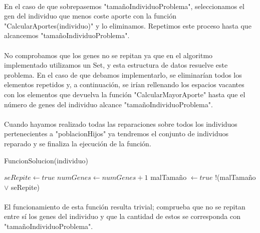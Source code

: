 	\paragraph{}En el caso de que sobrepasemos "tamañoIndividuoProblema", seleccionamos el gen del individuo que menos coste aporte con la función "CalcularAportes(individuo)" y lo eliminamos. Repetimos este proceso hasta que alcancemos "tamañoIndividuoProblema".
	
	\paragraph{}No comprobamos que los genes no se repitan ya que en el algoritmo implementado utilizamos un Set, y esta estructura de datos resuelve este problema. En el caso de que debamos implementarlo, se eliminarían todos los elementos repetidos y, a continuación, se irían rellenando los espacios vacantes con los elementos que devuelva la función "CalcularMayorAporte" hasta que el número de genes del individuo alcance "tamañoIndividuoProblema".
	
	\paragraph{}Cuando hayamos realizado todas las reparaciones sobre todos los individuos pertenecientes a "poblacionHijos" ya tendremos el conjunto de individuos reparado y se finaliza la ejecución de la función.

	\begin{algorithm}[H]
		\caption{FuncionSolucion(individuo)}
		\begin{algorithmic}
			\STATE $seRepite \leftarrow true$
			\ENDIF
			\ENDFOR
			\STATE $numGenes \leftarrow numGenes+1$
			\ENDFOR
			\STATE malTamaño $\leftarrow true$
			\ENDIF
			\RETURN !(malTamaño $\vee$ seRepite)
		\end{algorithmic}
	\end{algorithm}

	\paragraph{}El funcionamiento de esta función resulta trivial; comprueba que no se repitan entre sí los genes del individuo y que la cantidad de estos se corresponda con "tamañoIndividuoProblema".
	
